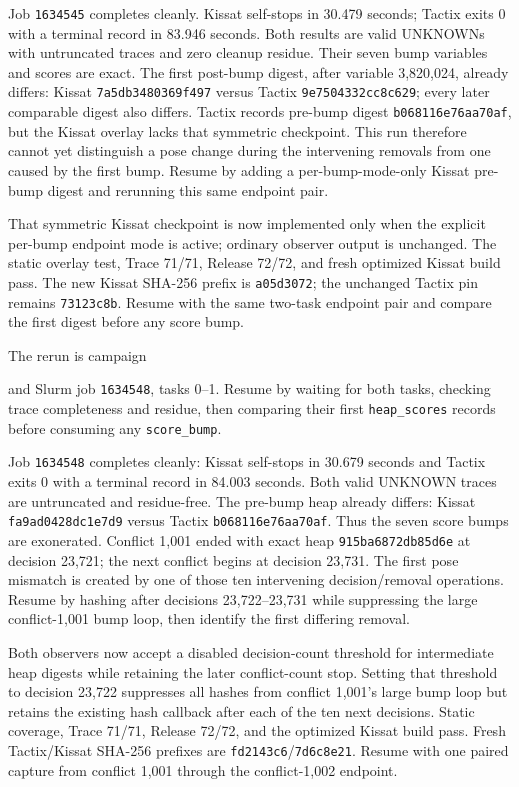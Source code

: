 \documentclass[11pt]{article}
\newcommand{\code}[1]{\texttt{#1}}
\newcommand{\artifact}[1]{\path{#1}}
\begin{document}
Job \code{1634545} completes cleanly. Kissat self-stops in 30.479 seconds;
Tactix exits 0 with a terminal record in 83.946 seconds. Both results are valid
UNKNOWNs with untruncated traces and zero cleanup residue. Their seven bump
variables and scores are exact. The first post-bump digest, after variable
3,820,024, already differs: Kissat \code{7a5db3480369f497} versus Tactix
\code{9e7504332cc8c629}; every later comparable digest also differs. Tactix
records pre-bump digest \code{b068116e76aa70af}, but the Kissat overlay lacks
that symmetric checkpoint. This run therefore cannot yet distinguish a pose
change during the intervening removals from one caused by the first bump.
Resume by adding a per-bump-mode-only Kissat pre-bump digest and rerunning this
same endpoint pair.

That symmetric Kissat checkpoint is now implemented only when the explicit
per-bump endpoint mode is active; ordinary observer output is unchanged. The
static overlay test, Trace 71/71, Release 72/72, and fresh optimized Kissat
build pass. The new Kissat SHA-256 prefix is \code{a05d3072}; the unchanged
Tactix pin remains \code{73123c8b}. Resume with the same two-task endpoint
pair and compare the first digest before any score bump.

The rerun is campaign
\begin{center}\small\artifact{20260819-0840-tierd-rank22-c1002-prebump-pair}\end{center}
and Slurm job \code{1634548}, tasks 0--1. Resume by waiting for both tasks,
checking trace completeness and residue, then comparing their first
\code{heap\_scores} records before consuming any \code{score\_bump}.

Job \code{1634548} completes cleanly: Kissat self-stops in 30.679 seconds and
Tactix exits 0 with a terminal record in 84.003 seconds. Both valid UNKNOWN
traces are untruncated and residue-free. The pre-bump heap already differs:
Kissat \code{fa9ad0428dc1e7d9} versus Tactix
\code{b068116e76aa70af}. Thus the seven score bumps are exonerated. Conflict
1,001 ended with exact heap \code{915ba6872db85d6e} at decision 23,721; the
next conflict begins at decision 23,731. The first pose mismatch is created by
one of those ten intervening decision/removal operations. Resume by hashing
after decisions 23,722--23,731 while suppressing the large conflict-1,001 bump
loop, then identify the first differing removal.

Both observers now accept a disabled decision-count threshold for intermediate
heap digests while retaining the later conflict-count stop. Setting that
threshold to decision 23,722 suppresses all hashes from conflict 1,001's large
bump loop but retains the existing hash callback after each of the ten next
decisions. Static coverage, Trace 71/71, Release 72/72, and the optimized
Kissat build pass. Fresh Tactix/Kissat SHA-256 prefixes are
\code{fd2143c6}/\code{7d6c8e21}. Resume with one paired capture from conflict
1,001 through the conflict-1,002 endpoint.
\end{document}
